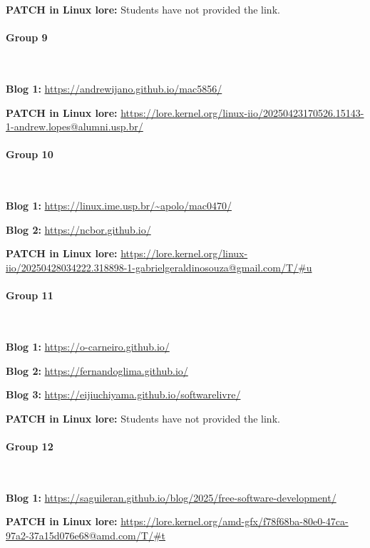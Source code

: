 \textbf{PATCH in Linux lore:} Students have not provided the link.

\paragraph{Group 9}

\

\textbf{Blog 1:} \url{https://andrewijano.github.io/mac5856/}

\textbf{PATCH in Linux lore:} \url{https://lore.kernel.org/linux-iio/20250423170526.15143-1-andrew.lopes@alumni.usp.br/}

\paragraph{Group 10}

\

\textbf{Blog 1:} \url{https://linux.ime.usp.br/~apolo/mac0470/}

\textbf{Blog 2:} \url{https://ncbor.github.io/}

\textbf{PATCH in Linux lore:} \url{https://lore.kernel.org/linux-iio/20250428034222.318898-1-gabrielgeraldinosouza@gmail.com/T/#u}

\paragraph{Group 11}

\

\textbf{Blog 1:} \url{https://o-carneiro.github.io/}

\textbf{Blog 2:} \url{https://fernandoglima.github.io/}

\textbf{Blog 3:} \url{https://eijiuchiyama.github.io/softwarelivre/}

\textbf{PATCH in Linux lore:} Students have not provided the link.

\paragraph{Group 12}

\

\textbf{Blog 1:} \url{https://saguileran.github.io/blog/2025/free-software-development/}

\textbf{PATCH in Linux lore:} \url{https://lore.kernel.org/amd-gfx/f78f68ba-80e0-47ca-97a2-37a15d076e68@amd.com/T/#t}

